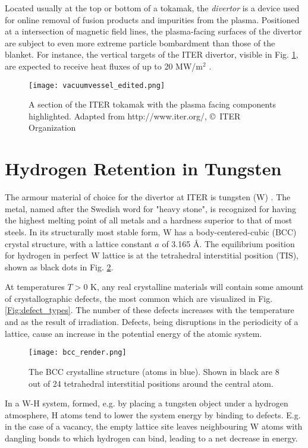 Located usually at the top or bottom of a tokamak, the \textit{divertor} is a device used for online removal of fusion products and impurities from the plasma.
Positioned at a intersection of magnetic field lines, the plasma-facing surfaces of the divertor are subject to even more extreme particle bombardment than those of the blanket.
For instance, the vertical targets of the ITER divertor, visible in Fig. \ref{fig:ITERslice}, are expected to receive heat fluxes of up to 20 MW/m$^2$ \cite{Iter1234Divertor}. 

\begin{figure}[!ht]
\center
\texttt{[image: vacuumvessel\_edited.png]}
\caption{A section of the ITER tokamak with the plasma facing components highlighted. Adapted from http://www.iter.org/, \copyright~ITER Organization}
\label{fig:ITERslice}
\end{figure}

\section{Hydrogen Retention in Tungsten}
The armour material of choice for the divertor at ITER is tungsten (W) \cite{PITTS2013S48}.
The metal, named after the Swedish word for "heavy stone", is recognized for having the highest melting point of all metals and a hardness superior to that of most steels. 
In its structurally most stable form, W has a body-centered-cubic (BCC) crystal structure, with a lattice constant $a$ of 3.165 \AA.
The equilibrium position for hydrogen in perfect W lattice is at the tetrahedral interstitial position (TIS), shown as black dots in Fig. \ref{Fig:bcc}. 

At temperatures $T > 0$ K, any real crystalline materials will contain some amount of crystallographic defects, the most common which are visualized in Fig. \ref{Fig:defect_types}. 
The number of these defects increases with the temperature and as the result of irradiation. 
Defects, being disruptions in the periodicity of a lattice, cause an increase in the potential energy of the atomic system. 
\begin{figure}[!ht]
\center
\texttt{[image: bcc\_render.png]}
\caption{The BCC crystalline structure (atoms in blue). Shown in black are 8 out of 24 tetrahedral interstitial positions around the central atom.}
\label{Fig:bcc}
\end{figure}
In a W-H system, formed, e.g. by placing a tungsten object under a hydrogen atmosphere, H atoms tend to lower the system energy by binding to defects. 
E.g. in the case of a vacancy, the empty lattice site leaves neighbouring W atoms with dangling bonds to which hydrogen can bind, leading to a net decrease in energy.

